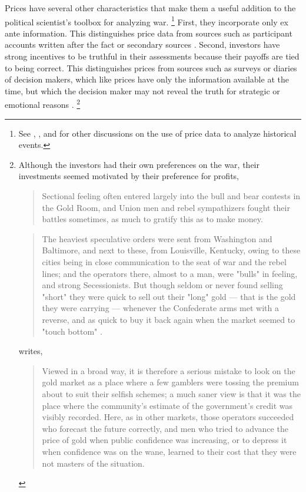 Prices have several other characteristics that make them a useful addition to the political scientist's toolbox for analyzing war.
\footnote{See \textcite{WillardGuinnaneEtAl1996}, \textcite{north2000introd}, and \textcite{FreyKucher2000} for other  discussions on the use of price data to analyze historical events.} %
First, they incorporate only ex ante information. This distinguishes price data from sources such as participant accounts written after the fact or secondary sources \parencites[1001]{WillardGuinnaneEtAl1996}[][188]{FreyKucher2000a}.
Second, investors have strong incentives to be truthful in their assessments because their payoffs are tied to being correct.
This distinguishes prices from sources such as surveys or diaries of decision makers, which like prices have only the information available at the time, but which the decision maker may not reveal the truth for strategic or emotional reasons \parencite[57]{Reiter2009}.%
\footnote{Although the investors had their own preferences on the war,
  their investments seemed motivated by their preference for profits,
  \begin{quote}
    Sectional feeling often entered largely into the bull and bear  contests in the Gold Room, and Union men and rebel sympathizers fought their battles sometimes, as much to gratify this as to make money.
    \textcite[7]{Cornwallis1879}
  \end{quote}
  \begin{quote}
    The heaviest speculative orders were sent from Washington and Baltimore, and next to these, from Louisville, Kentucky, owing to these cities being in close communication to the seat of war and the rebel lines; and the operators there, almost to a man, were "bulls" in feeling, and strong Secessionists.
    But though seldom or never found selling "short" they were quick to sell out their "long" gold --- that is the gold they were carrying --- whenever the Confederate arms met with a reverse, and as quick to buy it back again when the market seemed to "touch bottom" \textcite[5]{Cornwallis1879}.
  \end{quote}
  \textcite[210]{Mitchell1903} writes,
  \begin{quote}
    Viewed in a broad way, it is therefore a serious
    mistake to look on the gold market as a place where a few gamblers
    were tossing the premium about to suit their selfish schemes; a much
    saner view is that it was the place where the community's estimate
    of the government's credit was visibly recorded. Here, as in other
    markets, those operators succeeded who forecast the future
    correctly, and men who tried to advance the price of gold when
    public confidence was increasing, or to depress it when confidence
    was on the wane, learned to their cost that they were not masters of
    the situation.
  \end{quote}
} %
